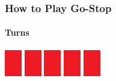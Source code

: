 \begin{frame}[fragile]
  \frametitle{How to Play Go-Stop}
  \framesubtitle{Turns}

  \begin{center}
    \parbox{\textwidth}{
      \centering
      \includegraphics[width=2em]{images/cards/hidden}
      \includegraphics[width=2em]{images/cards/hidden}
      \includegraphics[width=2em]{images/cards/hidden}
      \includegraphics[width=2em]{images/cards/hidden}
      \includegraphics[width=2em]{images/cards/hidden}
    }

    \vspace*{1.5em}


\end{center}
\end{frame}
